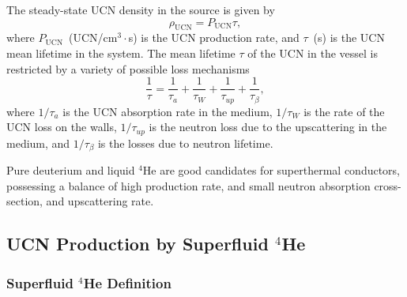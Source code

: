 
The steady-state UCN density in the source is given by
\begin{equation}
\label{ucndensity}
\rho_{\text{UCN}}=P_{\text{UCN}} \tau,
\end{equation}
where $P_{\text{UCN}}$~(UCN/cm$^3 \cdot$s) is the UCN production rate,
and $\tau$~(s) is the UCN mean lifetime in the system.  The mean
lifetime $\tau$ of the UCN in the vessel is restricted by a variety of
possible loss mechanisms
\begin{equation}
\frac{1}{\tau} = \frac{1}{\tau_a}+ \frac{1}{\tau_W}+\frac{1}{\tau_{up}}+\frac{1}{\tau_{\beta}},
\end{equation}
where $1/\tau_a$ is the UCN absorption rate in the medium, $1/\tau_W$
is the rate of the UCN loss on the walls, $1/\tau_{up}$ is the neutron
loss due to the upscattering in the medium, and $1/\tau_{\beta}$ is
the losses due to neutron lifetime.

Pure deuterium and liquid $^4$He are good candidates for superthermal
conductors, possessing a balance of high production rate, and small
neutron absorption cross-section, and upscattering rate.


\subsection{UCN Production by Superfluid $^4$He}

\subsubsection{Superfluid $^4$He Definition}

